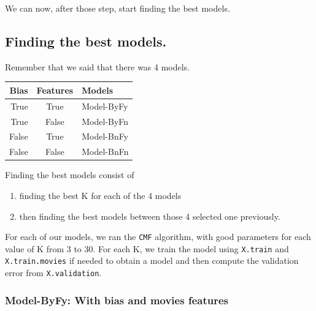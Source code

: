 \documentclass[
]{article}
\providecommand{\tightlist}{%
  \setlength{\itemsep}{0pt}\setlength{\parskip}{0pt}}
\begin{document}
We can now, after those step, start finding the best models.

\subsection{Finding the best models.}\label{finding-the-best-models.}

Remember that we said that there was 4 models.

\begin{longtable}[]{@{}rcl@{}}
\toprule\noalign{}
Bias & Features & Models \\
\midrule\noalign{}
\endhead
\bottomrule\noalign{}
\endlastfoot
True & True & Model-ByFy \\
True & False & Model-ByFn \\
False & True & Model-BnFy \\
False & False & Model-BnFn \\
\end{longtable}

Finding the best models consist of

\begin{enumerate}
\def\labelenumi{\arabic{enumi}.}
\tightlist
\item
  finding the best K for each of the 4 models
\item
  then finding the best models between those 4 selected one previously.
\end{enumerate}

For each of our models, we ran the \texttt{CMF} algorithm, with good
parameters for each value of K from 3 to 30. For each K, we train the
model using \texttt{X.train} and \texttt{X.train.movies} if needed to
obtain a model and then compute the validation error from
\texttt{X.validation}.

\subsubsection{Model-ByFy: With bias and movies
features}\label{model-byfy-with-bias-and-movies-features}
\end{document}
